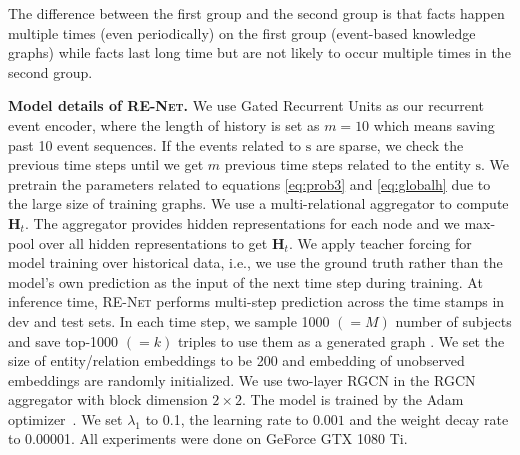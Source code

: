 \documentclass[11pt,a4paper]{article}
\newcommand{\bH}{\boldsymbol{H}}
\newcommand{\method}{\textsc{RE-Net}\xspace}
\newcommand{\para}[1]{\smallskip\noindent\textbf{#1}}
\newcommand{\bs}{\mathrm{s}}
\begin{document}
The difference between the first group and the second group is that facts happen multiple times (even periodically) on the first group (event-based knowledge graphs) while facts last long time but are not likely to occur multiple times in the second group.


\para{Model details of \method.}
We use Gated Recurrent Units \citep{Cho2014LearningPR} as our recurrent event encoder, where the length of history is set as $m = 10$ which means saving past 10 event sequences.
If the events related to $\bs$ are sparse, we check the previous time steps until we get $m$ previous time steps related to the entity $\bs$.
We pretrain the parameters related to equations \ref{eq:prob3} and \ref{eq:globalh} due to the large size of training graphs. 
We use a multi-relational aggregator to compute $\bH_t$. The aggregator provides hidden representations for each node and we max-pool over all hidden representations to get $\bH_t$.
We apply teacher forcing for model training over historical data, i.e., we use the ground truth rather than the model's own prediction as the input of the next time step during training.
At inference time, \method performs multi-step prediction across the time stamps in dev and test sets.
In each time step, we sample 1000 $(=M)$ number of subjects and save top-1000 $(=k)$ triples to use them as a generated graph .
We set the size of entity/relation embeddings to be 200 and embedding of unobserved embeddings are randomly initialized. 
We use two-layer RGCN in the RGCN aggregator with block dimension $2 \times 2$.
The model is trained by the Adam optimizer~\citep{kingma2014adam}.
We set $\lambda_1$ to 0.1, the learning rate to $0.001$ and the weight decay rate to 0.00001.
All experiments were done on GeForce GTX 1080 Ti.
\end{document}
